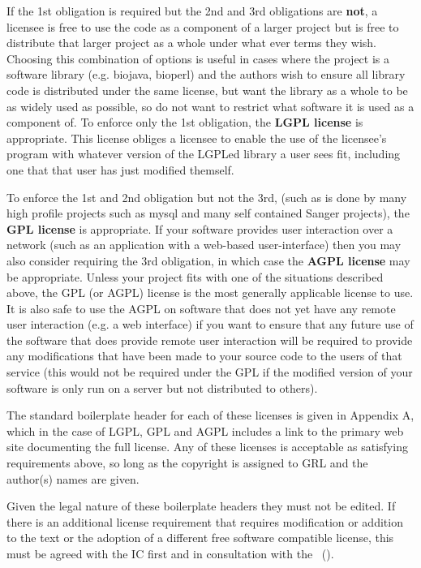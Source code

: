 \documentclass[10pt,a4paper]{article}
\begin{document}
If the 1st obligation is required but the 2nd and 3rd obligations are \textbf{not}, a licensee is free 
to use the code as a component of a larger project but is free to distribute that larger 
project as a whole under what ever terms they wish. Choosing this combination of 
options is useful in cases where the project is a software library (e.g. biojava, bioperl) 
and the authors wish to ensure all library code is distributed under the same license, 
but want the library as a whole to be as widely used as possible, so do not want to 
restrict what software it is used as a component of. To enforce only the 1st obligation, 
the \textbf{LGPL license} is appropriate. This license obliges a licensee to enable the use of the 
licensee's program with whatever version of the LGPLed library a user sees fit, 
including one that that user has just modified themself. 

To enforce the 1st and 2nd obligation but not the 3rd, (such as is done by many high 
profile projects such as mysql and many self contained Sanger projects), the \textbf{GPL 
license} is appropriate. If your software provides user interaction over a network (such 
as an application with a web-based user-interface) then you may also consider requiring 
the 3rd obligation, in which case the \textbf{AGPL license} may be appropriate. Unless your 
project fits with one of the situations described above, the GPL (or AGPL) license is the 
most generally applicable license to use. It is also safe to use the AGPL on software that 
does not yet have any remote user interaction (e.g. a web interface) if you want to 
ensure that any future use of the software that does provide remote user interaction will 
be required to provide any modifications that have been made to your source code to 
the users of that service (this would not be required under the GPL if the modified 
version of your software is only run on a server but not distributed to others). 
 
The standard boilerplate header for each of these licenses is given in Appendix A, 
which in the case of LGPL, GPL and AGPL includes a link to the primary web site 
documenting the full license. Any of these licenses is acceptable as satisfying 
requirements above, so long as the copyright is assigned to GRL 
and the author(s) names are given.

Given the legal nature of these boilerplate headers they must not be edited. If there is an 
additional license requirement that requires modification or addition to the text or the 
adoption of a different free software compatible license, this must be agreed with the 
IC first and in consultation with the \exectitle\ (\execperson).
\end{document}
